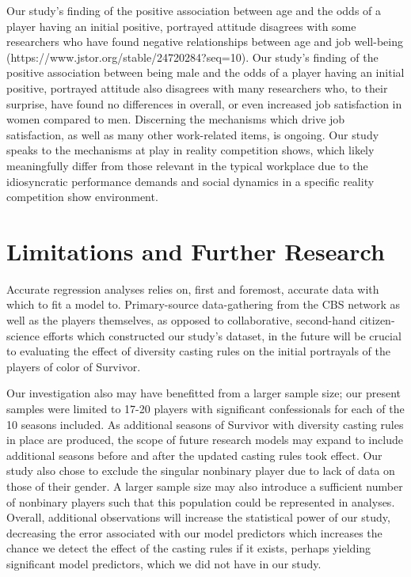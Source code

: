 \documentclass[
  letterpaper,
  DIV=11,
  numbers=noendperiod,
  oneside]{scrartcl}
\begin{document}
Our study's finding of the positive association between age and the odds
of a player having an initial positive, portrayed attitude disagrees
with some researchers who have found negative relationships between age
and job well-being (https://www.jstor.org/stable/24720284?seq=10). Our
study's finding of the positive association between being male and the
odds of a player having an initial positive, portrayed attitude also
disagrees with many researchers who, to their surprise, have found no
differences in overall, or even increased job satisfaction in women
compared to men. Discerning the mechanisms which drive job satisfaction,
as well as many other work-related items, is ongoing. Our study speaks
to the mechanisms at play in reality competition shows, which likely
meaningfully differ from those relevant in the typical workplace due to
the idiosyncratic performance demands and social dynamics in a specific
reality competition show environment.

\hypertarget{limitations-and-further-research}{%
\section{Limitations and Further
Research}\label{limitations-and-further-research}}

Accurate regression analyses relies on, first and foremost, accurate
data with which to fit a model to. Primary-source data-gathering from
the CBS network as well as the players themselves, as opposed to
collaborative, second-hand citizen-science efforts which constructed our
study's dataset, in the future will be crucial to evaluating the effect
of diversity casting rules on the initial portrayals of the players of
color of Survivor.

Our investigation also may have benefitted from a larger sample size;
our present samples were limited to 17-20 players with significant
confessionals for each of the 10 seasons included. As additional seasons
of Survivor with diversity casting rules in place are produced, the
scope of future research models may expand to include additional seasons
before and after the updated casting rules took effect. Our study also
chose to exclude the singular nonbinary player due to lack of data on
those of their gender. A larger sample size may also introduce a
sufficient number of nonbinary players such that this population could
be represented in analyses. Overall, additional observations will
increase the statistical power of our study, decreasing the error
associated with our model predictors which increases the chance we
detect the effect of the casting rules if it exists, perhaps yielding
significant model predictors, which we did not have in our study.
\end{document}
